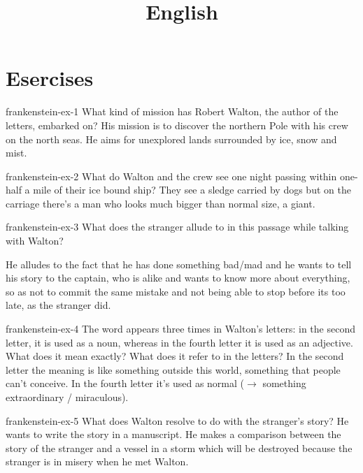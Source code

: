 \documentclass[preview]{standalone}
\begin{document}
\title{English}
\genpage

\section{Esercises}

\begin{snippetexercise}{frankenstein-ex-1}
    {What kind of mission has Robert Walton, the author of the letters, embarked on?}
    His mission is to discover the northern Pole with his crew on the north seas.
    He aims for unexplored lands surrounded by ice, snow and mist.
\end{snippetexercise}

\begin{snippetexercise}{frankenstein-ex-2}
    {What do Walton and the crew see one night passing within one-half a mile of their ice bound
    ship?}
    They see a sledge carried by dogs but on the carriage there's a man who
    looks much bigger than normal size, a giant.
\end{snippetexercise}

\begin{snippetexercise}{frankenstein-ex-3}
    {What does the stranger allude to in this passage while talking with Walton?}
    \begin{center}
    \end{center}
    He alludes to the fact that he has done something bad/mad and he wants to tell
    his story to the captain, who is alike and wants to know more about
    everything, so as not to commit the same mistake and not being able to
    stop before its too late, as the stranger did.
\end{snippetexercise}

\begin{snippetexercise}{frankenstein-ex-4}
    {The word  appears three times in Walton's letters: in the second letter, it is used as
    a noun, whereas in the fourth letter it is used as an adjective. What does it mean exactly? What
    does it refer to in the letters?}
    In the second letter the meaning is like something outside this world, something
    that people can't conceive. In the fourth letter it's used as normal
    (\(\rightarrow\) something extraordinary / miraculous).
\end{snippetexercise}

\begin{snippetexercise}{frankenstein-ex-5}
    {What does Walton resolve to do with the stranger's story?}
    He wants to write the story in a manuscript. He makes a comparison between the
    story of the stranger and a vessel in a storm which will be destroyed because
    the stranger is in misery when he met Walton.
\end{snippetexercise}
\end{document}
